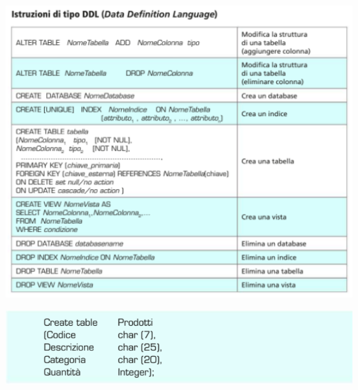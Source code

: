 \documentclass{article}
\begin{document}
\includegraphics[scale=1.5]{ddl1.PNG}



\includegraphics[h, scale=0.8]{ddl.PNG}    
\end{document}
